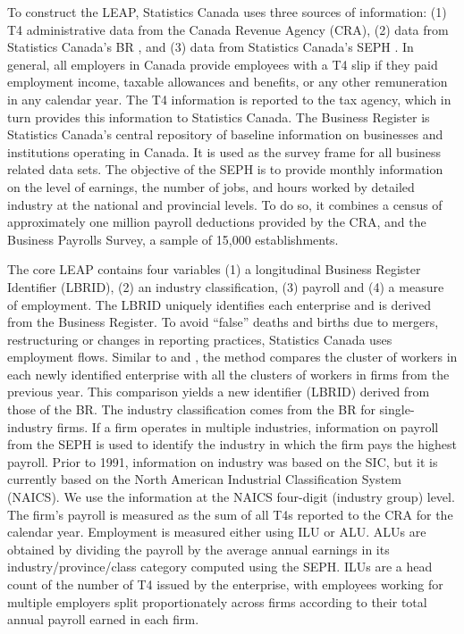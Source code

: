 \documentclass[10pt,twoside]{article}
\begin{document}
To construct the \ac{LEAP}, Statistics Canada uses three sources of information: (1) T4 administrative data  from the Canada Revenue Agency (CRA), (2) data from Statistics Canada's \acl{BR} \citep{StatisticsCanada2019a}, and (3) data from  Statistics Canada's \acf{SEPH} \citep{StatisticsCanada2019b}. 
In general, all employers in Canada provide employees with a T4 slip if they paid employment income, taxable allowances and benefits, or any other remuneration in any calendar year. The T4 information is reported to the tax agency, which in turn provides this information to Statistics Canada. 
The Business Register is Statistics Canada's central repository of baseline information on businesses and institutions operating in Canada. It is used as the survey frame for all business related data sets.
The objective of the \ac{SEPH} is to provide monthly information on the level of earnings, the number of jobs, and hours worked by detailed industry at the national and provincial levels. To do so, it combines a census of approximately one million payroll deductions provided by the CRA, and the Business Payrolls Survey, a sample of 15,000 establishments.  


The core \ac{LEAP}  contains four variables (1) a longitudinal Business Register Identifier (LBRID), (2) an industry classification, (3) payroll and (4) a measure of employment. 
The LBRID uniquely identifies each enterprise and is derived from the Business Register. To avoid ``false'' deaths and births due to mergers, restructuring or changes in reporting practices, Statistics Canada uses employment flows. Similar to \citet{BenedettoEtAl2007} and \citet{RePEc:iab:iabfme:201006_en}, the method  compares the cluster of workers in each newly identified enterprise with all the clusters of workers in firms from the previous year. This comparison yields a new identifier (LBRID) derived from those of the \ac{BR}.
The industry classification comes from the \ac{BR} for single-industry firms. If a firm operates in multiple industries, information on payroll from the \ac{SEPH} is used to identify the industry in which the firm pays the highest payroll. Prior to 1991, information on industry was based on the SIC,  but it is currently based on the  North American Industrial Classification System (NAICS). We use the information at the NAICS four-digit (industry group) level. 
The firm's payroll is measured as the sum of all T4s  reported to the CRA for the calendar year.
Employment is measured either using \ac{ILU} or \ac{ALU}. \acp{ALU} are obtained by dividing the payroll by the average annual earnings in its industry/province/class category computed using the \ac{SEPH}. \acp{ILU} are a head count of the number of T4 issued by the enterprise, with employees working for multiple employers split proportionately across firms according to their total annual payroll earned in each firm. 
\end{document}

